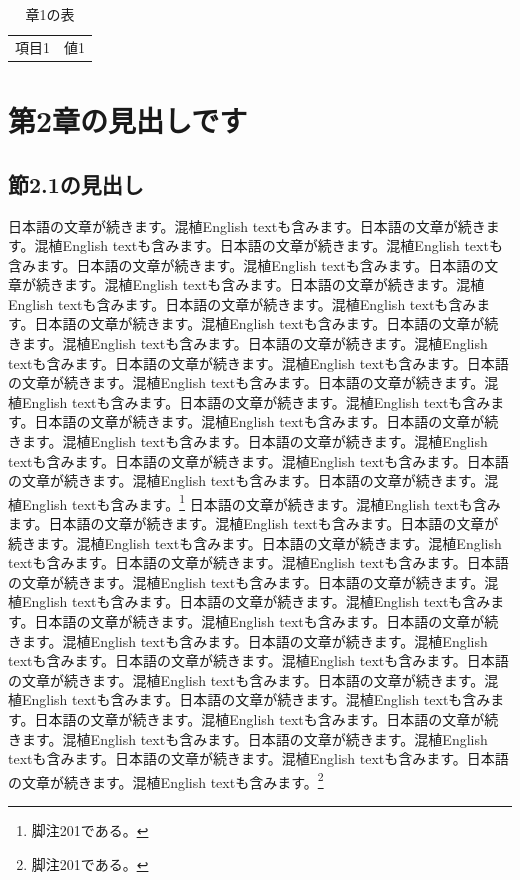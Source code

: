 \documentclass[pdflatex,book]{jlreq}
\begin{document}
\begin{table}[htbp]\centering\caption{章1の表}\begin{tabular}{cc}項目1 & 値1\\\end{tabular}\end{table}

\chapter{第2章の見出しです}
\section{節2.1の見出し}
日本語の文章が続きます。混植English textも含みます。日本語の文章が続きます。混植English textも含みます。日本語の文章が続きます。混植English textも含みます。日本語の文章が続きます。混植English textも含みます。日本語の文章が続きます。混植English textも含みます。日本語の文章が続きます。混植English textも含みます。日本語の文章が続きます。混植English textも含みます。日本語の文章が続きます。混植English textも含みます。日本語の文章が続きます。混植English textも含みます。日本語の文章が続きます。混植English textも含みます。日本語の文章が続きます。混植English textも含みます。日本語の文章が続きます。混植English textも含みます。日本語の文章が続きます。混植English textも含みます。日本語の文章が続きます。混植English textも含みます。日本語の文章が続きます。混植English textも含みます。日本語の文章が続きます。混植English textも含みます。日本語の文章が続きます。混植English textも含みます。日本語の文章が続きます。混植English textも含みます。日本語の文章が続きます。混植English textも含みます。日本語の文章が続きます。混植English textも含みます。\footnote{脚注201である。}
日本語の文章が続きます。混植English textも含みます。日本語の文章が続きます。混植English textも含みます。日本語の文章が続きます。混植English textも含みます。日本語の文章が続きます。混植English textも含みます。日本語の文章が続きます。混植English textも含みます。日本語の文章が続きます。混植English textも含みます。日本語の文章が続きます。混植English textも含みます。日本語の文章が続きます。混植English textも含みます。日本語の文章が続きます。混植English textも含みます。日本語の文章が続きます。混植English textも含みます。日本語の文章が続きます。混植English textも含みます。日本語の文章が続きます。混植English textも含みます。日本語の文章が続きます。混植English textも含みます。日本語の文章が続きます。混植English textも含みます。日本語の文章が続きます。混植English textも含みます。日本語の文章が続きます。混植English textも含みます。日本語の文章が続きます。混植English textも含みます。日本語の文章が続きます。混植English textも含みます。日本語の文章が続きます。混植English textも含みます。日本語の文章が続きます。混植English textも含みます。\footnote{脚注201である。}
\end{document}
